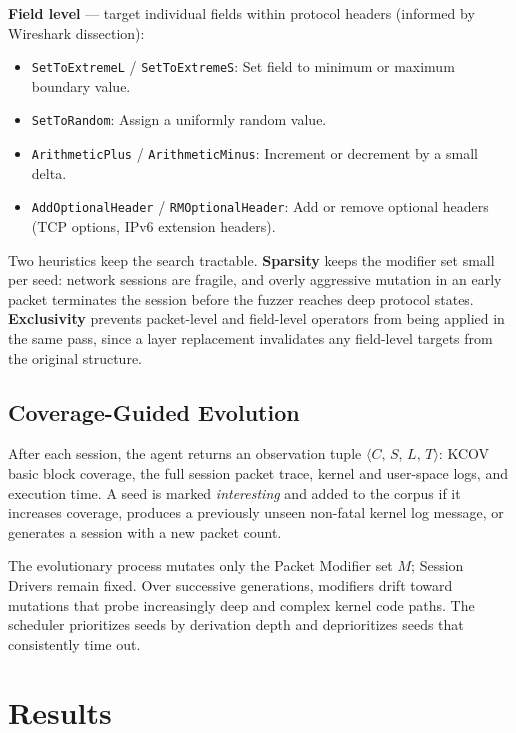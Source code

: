 \documentclass[10pt]{article}
\begin{document}
\textbf{Field level} --- target individual fields within protocol headers (informed by Wireshark dissection):
\begin{itemize}
  \item \texttt{SetToExtremeL} / \texttt{SetToExtremeS}: Set field to minimum or maximum boundary value.
  \item \texttt{SetToRandom}: Assign a uniformly random value.
  \item \texttt{ArithmeticPlus} / \texttt{ArithmeticMinus}: Increment or decrement by a small delta.
  \item \texttt{AddOptionalHeader} / \texttt{RMOptionalHeader}: Add or remove optional headers (TCP options, IPv6 extension headers).
\end{itemize}

Two heuristics keep the search tractable. \textbf{Sparsity} keeps the modifier set small per seed: network sessions are fragile, and overly aggressive mutation in an early packet terminates the session before the fuzzer reaches deep protocol states. \textbf{Exclusivity} prevents packet-level and field-level operators from being applied in the same pass, since a layer replacement invalidates any field-level targets from the original structure.

\subsection{Coverage-Guided Evolution}

After each session, the agent returns an observation tuple $\langle C,\, S,\, L,\, T \rangle$: KCOV basic block coverage, the full session packet trace, kernel and user-space logs, and execution time. A seed is marked \emph{interesting} and added to the corpus if it increases coverage, produces a previously unseen non-fatal kernel log message, or generates a session with a new packet count.

The evolutionary process mutates only the Packet Modifier set $M$; Session Drivers remain fixed. Over successive generations, modifiers drift toward mutations that probe increasingly deep and complex kernel code paths. The scheduler prioritizes seeds by derivation depth and deprioritizes seeds that consistently time out.

\section{Results}
\end{document}
